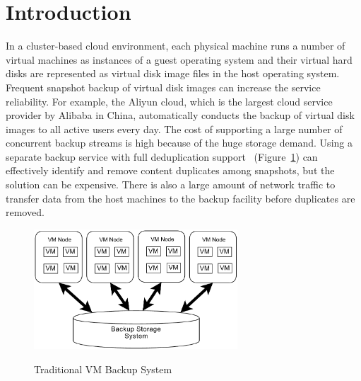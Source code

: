\section{Introduction}
In a cluster-based cloud environment,
each physical machine runs a number  of virtual machines as  instances of a guest operating system 
and their  virtual hard disks are represented as virtual disk image files in the host operating system.
Frequent  snapshot backup of virtual disk images  can increase  the service reliability. 
For example, the Aliyun cloud, which is  the largest cloud service provider by Alibaba in China, 
automatically conducts  the backup of virtual disk images to all active users every day.
The cost of supporting a large number of concurrent backup streams is high
because of the huge storage demand. 
Using a separate  backup service with full deduplication support~\cite{venti02,bottleneck08}
(Figure~\ref{fig-traditional-arch})
can effectively identify and remove content duplicates among snapshots, 
but the solution can be expensive. There is also a large amount of 
network traffic to transfer  data from the host machines to the backup facility
before duplicates are removed.

\begin{figure}[htb]
    \centering
    \includegraphics[width=3in]{images/traditional-arch.pdf}
    \label{fig-traditional-arch}
    \caption{Traditional VM Backup System}
\end{figure}


